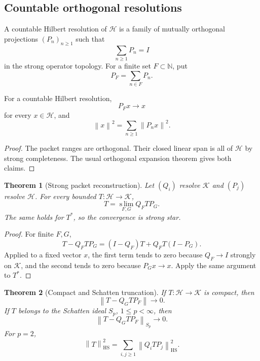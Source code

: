 \documentclass{aomart}
\newtheorem{theorem}{Theorem}[section]
\theoremstyle{definition}
\theoremstyle{remark}
\newcommand{\NN}{\mathbb N}
\newcommand{\K}{\mathcal K}
\newcommand{\Hh}{\mathcal H}
\newcommand{\norm}[1]{\left\lVert#1\right\rVert}
\begin{document}
\subsection{Countable orthogonal resolutions}

\begin{definition}\label{def:countable_resolution}
A countable Hilbert resolution of \(\Hh\) is a family of mutually orthogonal projections \((P_n)_{n\ge1}\) such that
\[
 \sum_{n\ge1}P_n=I
\]
in the strong operator topology. For a finite set \(F\subset\NN\), put
\[
 P_F=\sum_{n\in F}P_n.
\]
\end{definition}

\begin{lemma}\label{lem:strong_packet_sum}
For a countable Hilbert resolution,
\[
 P_Fx\longrightarrow x
\]
for every \(x\in\Hh\), and
\[
 \norm{x}^2
 =
 \sum_{n\ge1}\norm{P_nx}^2.
\]
\end{lemma}

\begin{proof}
The packet ranges are orthogonal. Their closed linear span is all of \(\Hh\) by strong completeness. The usual orthogonal expansion theorem gives both claims.
\end{proof}

\begin{theorem}[Strong packet reconstruction]\label{thm:strong_reconstruction}
Let \((Q_i)\) resolve \(\K\) and \((P_j)\) resolve \(\Hh\). For every bounded \(T:\Hh\to\K\),
\[
 \boxed{
 T
 =
 \operatorname*{s\!\!\lim}_{F,G}
 Q_FTP_G.
 }
\]
The same holds for \(T^*\), so the convergence is strong star.
\end{theorem}

\begin{proof}
For finite \(F,G\),
\[
 T-Q_FTP_G
 =
 (I-Q_F)T+Q_FT(I-P_G).
\]
Applied to a fixed vector \(x\), the first term tends to zero because \(Q_F\to I\) strongly on \(\K\), and the second tends to zero because \(P_Gx\to x\). Apply the same argument to \(T^*\).
\end{proof}

\begin{theorem}[Compact and Schatten truncation]\label{thm:compact_truncation}
If \(T:\Hh\to\K\) is compact, then
\[
 \norm{T-Q_GTP_F}\longrightarrow0.
\]
If \(T\) belongs to the Schatten ideal \(S_p\), \(1\le p<\infty\), then
\[
 \norm{T-Q_GTP_F}_{S_p}\longrightarrow0.
\]
For \(p=2\),
\[
 \boxed{
 \norm{T}_{\mathrm{HS}}^2
 =
 \sum_{i,j\ge1}\norm{Q_iTP_j}_{\mathrm{HS}}^2.
 }
\]
\end{theorem}
\end{document}
